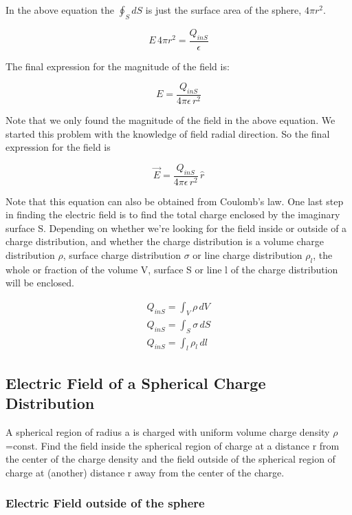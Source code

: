\documentclass{ximera}
\begin{document}
In the above equation the $\oint_S dS $ is just the surface area of the sphere, $4 \pi r^2$.


\begin{equation}
 E \, 4 \pi r^2 = \frac{Q_{inS}}{\epsilon}
\end{equation}

The final expression for the magnitude of the field is:


\begin{equation}
 E  = \frac{Q_{inS}}{4 \pi  \epsilon \, r^2}
\end{equation}

Note that we only found the magnitude of the field in the above equation. We started this problem with the knowledge of field radial direction. So the final expression for the field is

\begin{equation}
 \vec{E}  = \frac{Q_{inS}}{4 \pi  \epsilon \, r^2} \, \hat{r}
\end{equation}

Note that this equation can also be obtained from Coulomb's law. One last step in finding the electric field is to find the total charge enclosed by the imaginary surface S. Depending on whether we're looking for the field inside or outside of a charge distribution, and whether the charge distribution is a volume charge distribution $\rho$, surface charge distribution $\sigma$ or line charge distribution $\rho_l$, the whole or fraction of the volume V, surface S or line l of the charge distribution will be enclosed. 

\begin{eqnarray}
Q_{inS} = \int_V \rho \, dV \\
Q_{inS} =\int_S \sigma \, dS \\
Q_{inS} = \int_l \rho_l \, dl 
\end{eqnarray}

\subsection{Electric Field of a  Spherical Charge Distribution}


A spherical region of radius a is charged with uniform volume charge density $\rho$=const. Find the field inside the spherical region of charge at a distance r from the center of the charge density and the field outside of the spherical region of charge at (another) distance r away from the center of the charge.

\subsubsection{Electric Field outside of the sphere}
\end{document}
